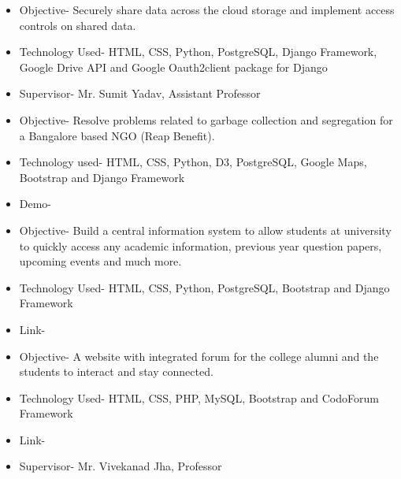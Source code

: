 \documentclass[9.5pt,a4paper]{altacv}
\begin{document}
\medskip

\begin{itemize}
\item Objective- Securely share data across the cloud storage and implement access controls on shared data.
\item Technology Used- HTML, CSS, Python, PostgreSQL, Django Framework, Google Drive API and Google Oauth2client package for Django
\item Supervisor- Mr. Sumit Yadav, Assistant Professor
\end{itemize}

\divider

\begin{itemize}
\item Objective- Resolve problems related to garbage collection and segregation for a Bangalore based NGO (Reap Benefit).
\item Technology used- HTML, CSS, Python, D3, PostgreSQL, Google Maps, Bootstrap and Django Framework
\item Demo- \href{https://youtu.be/UP\_KwSg6GIk}{}
\end{itemize}

\divider

\begin{itemize}
\item Objective- Build a central information system to allow students at university to quickly access any academic information, previous year question papers, upcoming events and much more.
\item Technology Used- HTML, CSS, Python, PostgreSQL, Bootstrap and Django Framework
\item Link- \href{http://igdtuwonline.herokuapp.com/}{}
\end{itemize}


\begin{itemize}
\item Objective- A website with integrated forum for the college alumni and the students to interact and stay connected.
\item Technology Used- HTML, CSS, PHP, MySQL, Bootstrap and CodoForum Framework
\item Link- \href{http://fatimarafiqui.com/work/igdtuwalumni/}{}
\item Supervisor- Mr. Vivekanad Jha, Professor
\end{itemize}
\end{document}
